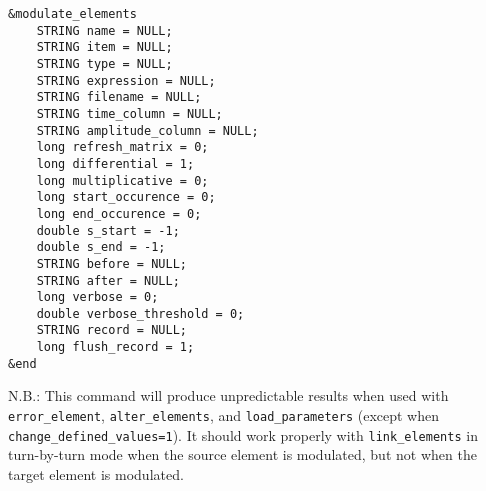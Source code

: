 \documentclass[11pt]{article}
\begin{document}
\begin{verbatim}
&modulate_elements
    STRING name = NULL;
    STRING item = NULL;
    STRING type = NULL;
    STRING expression = NULL;
    STRING filename = NULL;
    STRING time_column = NULL;
    STRING amplitude_column = NULL;
    long refresh_matrix = 0;
    long differential = 1;
    long multiplicative = 0;
    long start_occurence = 0;
    long end_occurence = 0;
    double s_start = -1;
    double s_end = -1;
    STRING before = NULL;
    STRING after = NULL;
    long verbose = 0;
    double verbose_threshold = 0;
    STRING record = NULL;
    long flush_record = 1;
&end
\end{verbatim}

N.B.: This command will produce unpredictable results when used with
\verb|error_element|, \verb|alter_elements|, and
\verb|load_parameters| (except when \verb|change_defined_values=1|).
It should work properly with \verb|link_elements| in turn-by-turn mode
when the source element is modulated, but not when the target element
is modulated.
\end{document}
